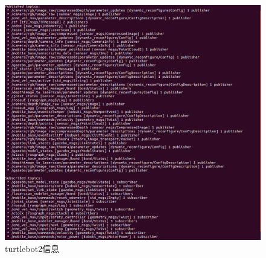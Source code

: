 \documentclass[a4paper]{article}
\begin{document}
	\begin{figure}
		\includegraphics[scale=0.4]{turtlebot2_rostopic.png}
		\caption{turtlebot2信息}
	\end{figure}
	
\end{document}
